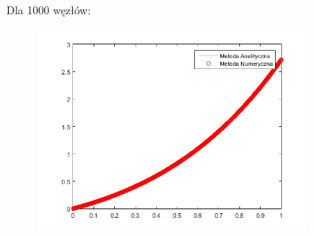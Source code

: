 \begin{samepage}
	Dla 1000 węzłów:
	
	\begin{figure}[!ht]
		\begin{center}
			\includegraphics[width=0.8\textwidth]{Lab4/charts/zad4/1/1000.png}
		\end{center}
	\end{figure}
	\FloatBarrier
\end{samepage}    

\newpage

